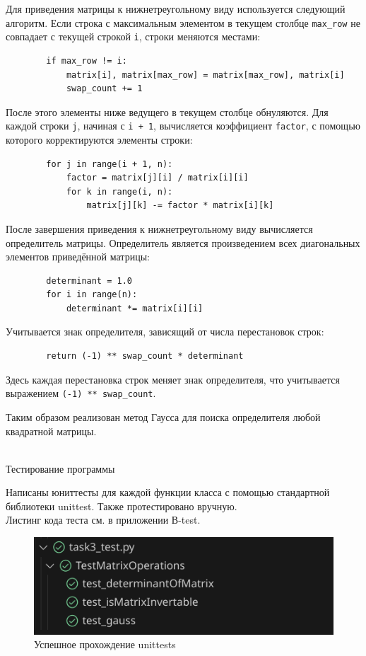 \begin{itemize}
	Для приведения матрицы к нижнетреугольному виду используется следующий алгоритм. Если строка с максимальным элементом в текущем столбце \texttt{max\_row} не совпадает с текущей строкой \texttt{i}, строки меняются местами:
	
	\begin{lstlisting}
		if max_row != i:
			matrix[i], matrix[max_row] = matrix[max_row], matrix[i]
			swap_count += 1
	\end{lstlisting}
	
	После этого элементы ниже ведущего в текущем столбце обнуляются. Для каждой строки \texttt{j}, начиная с \texttt{i + 1}, вычисляется коэффициент \texttt{factor}, с помощью которого корректируются элементы строки:
	
	\begin{lstlisting}
		for j in range(i + 1, n):
			factor = matrix[j][i] / matrix[i][i]
			for k in range(i, n):
				matrix[j][k] -= factor * matrix[i][k]
	\end{lstlisting}
	
	После завершения приведения к нижнетреугольному виду вычисляется определитель матрицы. Определитель является произведением всех диагональных элементов приведённой матрицы:
	
	\begin{lstlisting}
		determinant = 1.0
		for i in range(n):
			determinant *= matrix[i][i]
	\end{lstlisting}
	
	Учитывается знак определителя, зависящий от числа перестановок строк:
	
	\begin{lstlisting}
		return (-1) ** swap_count * determinant
	\end{lstlisting}
	
	Здесь каждая перестановка строк меняет знак определителя, что учитывается выражением \texttt{(-1) ** swap\_count}.
\end{itemize}
Таким образом реализован метод Гаусса для поиска определителя любой квадратной матрицы.\\ \\
\begin{large}
	Тестирование программы\\
\end{large}
Написаны юниттесты для каждой функции класса с помощью стандартной библиотеки unittest. Также протестировано вручную.\\
Листинг кода теста см. в приложении В-test.\\
\begin{figure}[H]
	\centering
	\includegraphics[width=0.5\linewidth]{tests-task9}
	\caption*{Успешное прохождение unittests}
	\label{fig:tests-task9}
\end{figure}
